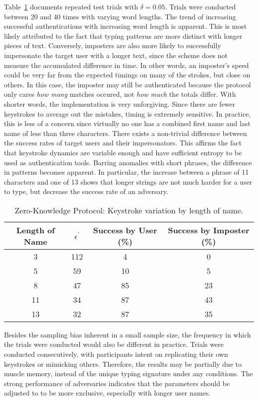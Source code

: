 \documentclass[11pt]{article}
\begin{document}
Table~\ref{table:res-zkp} documents repeated test trials with $\delta=0.05$. Trials were conducted between 20 and 40 times with varying word lengths. The trend of increasing successful authentications with increasing word length is apparent. This is most likely attributed to the fact that typing patterns are more distinct with longer pieces of text. Conversely, imposters are also more likely to successfully impersonate the target user with a longer text, since the scheme does not measure the accumulated difference in time. In other words, an imposter's speed could be very far from the expected timings on many of the strokes, but close on others. In this case, the imposter may still be authenticated because the protocol only cares \textit{how many} matches occured, not \textit{how much} the totals differ. With shorter words, the implementation is very unforgiving.  Since there are fewer keystrokes to average out the mistakes, timing is extremely sensitive.  In practice, this is less of a concern since virtually no one has a combined first name and last name of less than three characters. There exists a non-trivial difference between the success rates of target users and their impersonators. This affirms the fact that keystroke dynamics are variable enough and have sufficient entropy to be used as authentication tools. Barring anomalies with short phrases, the difference in patterns becomes apparent. In particular, the increase between a phrase of 11 characters and one of 13 shows that longer strings are not much harder for a user to type, but decrease the success rate of an adversary.

\begin{table}[h!]
\centering
\begin{tabular}{|c c c c|}
 \hline
 Length of Name & $\epsilon^{'}$ & Success by User (\%) & Success by Imposter (\%) \\ [0.5ex] 
 \hline\hline
 3 & 112 & 4 & 0 \\ 
 5 & 59 & 10 & 5 \\
 8 & 47 & 85 & 23 \\ 
 11 & 34 & 87 & 43 \\
 13 & 32 & 87 & 35 \\ [1ex] 
 \hline
\end{tabular}
\caption{Zero-Knowledge Protocol: Keystroke variation by length of name.}
\label{table:res-zkp}
\end{table}

Besides the sampling bias inherent in a small sample size, the frequency in which the trials were conducted would also be different in practice. Trials were conducted consecutively, with participants intent on replicating their own keystrokes or mimicking others. Therefore, the results may be partially due to muscle memory, instead of the unique typing signature under any conditions. The strong performance of adversaries indicates that the parameters should be adjusted to to be more exclusive, especially with longer user names.
\end{document}
